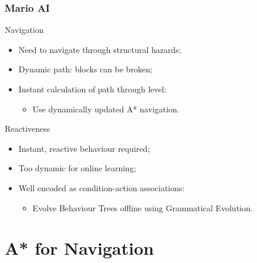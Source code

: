\documentclass{beamer}
\begin{document}
\begin{frame}{}
	\frametitle{Mario AI}
	\begin{block}{Navigation}
		\begin{itemize}
			\item Need to navigate through structural hazards;
			\item Dynamic path: blocks can be broken;
			\item Instant calculation of path through level:
			\begin{itemize}
				\item Use dynamically updated A* navigation.
			\end{itemize}
		\end{itemize}
	\end{block}
	\begin{block}{Reactiveness}
		\begin{itemize}
			\item Instant, reactive behaviour required;
			\item Too dynamic for online learning;
			\item Well encoded as condition-action associations:
			\begin{itemize}
				\item Evolve Behaviour Trees offline using Grammatical Evolution.
			\end{itemize}
		\end{itemize}
	\end{block}
	\vfill
\end{frame}

\section{A* for Navigation}
\end{document}
